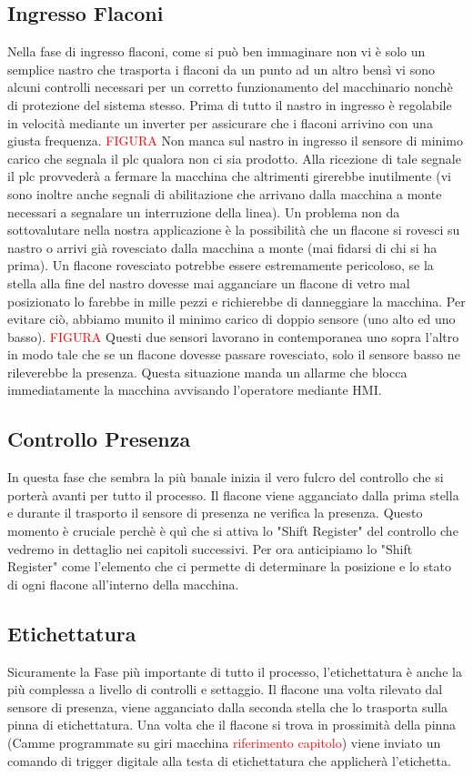 \documentclass[12pt, a4paper, oneside]{book}
\begin{document}
\subsection{Ingresso Flaconi}
Nella fase di ingresso flaconi, come si può ben immaginare non vi è solo un semplice nastro che trasporta i flaconi da un punto ad un altro bensì vi sono alcuni controlli necessari per un corretto funzionamento del macchinario nonchè di protezione del sistema stesso. Prima di tutto il nastro in ingresso è regolabile in velocità mediante un inverter per assicurare che i flaconi arrivino con una giusta frequenza. \textcolor{red}{FIGURA} Non manca sul nastro in ingresso il sensore di minimo carico che segnala il plc qualora non ci sia prodotto. Alla ricezione di tale segnale il plc provvederà a fermare la macchina che altrimenti girerebbe inutilmente (vi sono inoltre anche segnali di abilitazione che arrivano dalla macchina a monte necessari a segnalare un interruzione della linea).
Un problema non da sottovalutare nella nostra applicazione è la possibilità che un flacone si rovesci su nastro o arrivi già rovesciato dalla macchina a monte (mai fidarsi di chi si ha prima). Un flacone rovesciato potrebbe essere estremamente pericoloso, se la stella alla fine del nastro dovesse mai agganciare un flacone di vetro mal posizionato lo farebbe in mille pezzi e richierebbe di danneggiare la macchina. Per evitare ciò, abbiamo munito il minimo carico di doppio sensore (uno alto ed uno basso). \textcolor{red}{FIGURA} Questi due sensori lavorano in contemporanea uno sopra l'altro in modo tale che se un flacone dovesse passare rovesciato, solo il sensore basso ne rileverebbe la presenza. Questa situazione manda un allarme che blocca immediatamente la macchina avvisando l'operatore mediante HMI.  
   
\subsection{Controllo Presenza}
In questa fase che sembra la più banale inizia il vero fulcro del controllo che si porterà avanti per tutto il processo. Il flacone viene agganciato dalla prima stella e durante il trasporto il sensore di presenza ne verifica la presenza. 
Questo momento è cruciale perchè è quì che si attiva lo "Shift Register" del controllo che vedremo in dettaglio nei capitoli successivi. Per ora anticipiamo lo "Shift Register" come l'elemento che ci permette di determinare la posizione e lo stato di ogni flacone all'interno della macchina.
\subsection{Etichettatura}
Sicuramente la Fase più importante di tutto il processo, l'etichettatura è anche la più complessa a livello di controlli e settaggio. Il flacone una volta rilevato dal sensore di presenza, viene agganciato dalla seconda stella che lo trasporta sulla pinna di etichettatura. Una volta che il flacone si trova in prossimità della pinna (Camme programmate su giri macchina \textcolor{red}{riferimento capitolo}) viene inviato un comando di trigger digitale alla testa di etichettatura che applicherà l'etichetta. 
\end{document}
